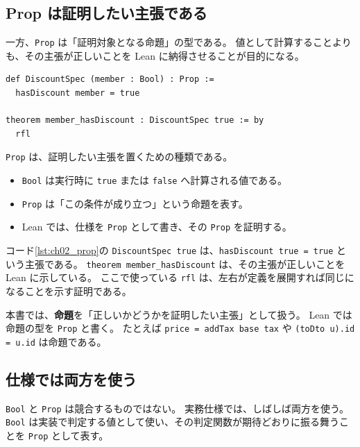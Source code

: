 \subsection{Prop は証明したい主張である}

一方、\texttt{Prop} は「証明対象となる命題」の型である。
値として計算することよりも、その主張が正しいことを Lean に納得させることが目的になる。

\begin{listing}[htbp]
\begin{verbatim}
def DiscountSpec (member : Bool) : Prop :=
  hasDiscount member = true

theorem member_hasDiscount : DiscountSpec true := by
  rfl
\end{verbatim}
\caption{Prop は証明したい主張である}
\label{lst:ch02_prop}
\end{listing}

\begin{syntaxbox}
\texttt{Prop} は、証明したい主張を置くための種類である。
\begin{itemize}
\item \texttt{Bool} は実行時に \texttt{true} または \texttt{false} へ計算される値である。
\item \texttt{Prop} は「この条件が成り立つ」という命題を表す。
\item Lean では、仕様を \texttt{Prop} として書き、その \texttt{Prop} を証明する。
\end{itemize}
\end{syntaxbox}


コード\ref{lst:ch02_prop}の \texttt{DiscountSpec true} は、\texttt{hasDiscount true = true} という主張である。
\texttt{theorem member\_hasDiscount} は、その主張が正しいことを Lean に示している。
ここで使っている \texttt{rfl} は、左右が定義を展開すれば同じになることを示す証明である。

\begin{definitionbox}
本書では、\textbf{命題}を「正しいかどうかを証明したい主張」として扱う。
Lean では命題の型を \texttt{Prop} と書く。
たとえば \texttt{price = addTax base tax} や \texttt{(toDto u).id = u.id} は命題である。
\end{definitionbox}

\subsection{仕様では両方を使う}

\texttt{Bool} と \texttt{Prop} は競合するものではない。
実務仕様では、しばしば両方を使う。
\texttt{Bool} は実装で判定する値として使い、その判定関数が期待どおりに振る舞うことを \texttt{Prop} として表す。

